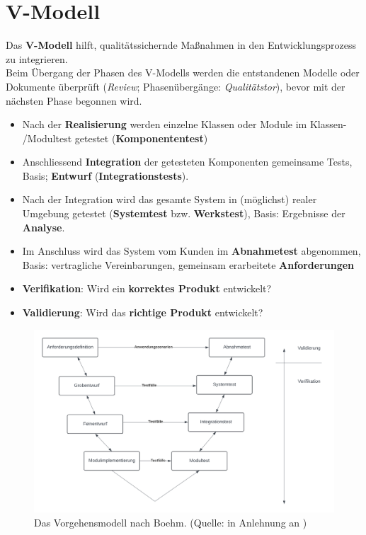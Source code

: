 \section{V-Modell}

\begin{tcolorbox}[title=V-Modell]
    Das \textbf{V-Modell} hilft, qualitätssichernde Maßnahmen in den Entwicklungsprozess zu integrieren.\\
    Beim Übergang der Phasen des V-Modells werden die entstandenen Modelle oder Dokumente überprüft (\textit{Review}; Phasenübergänge: \textit{Qualitätstor}), bevor mit der nächsten Phase begonnen wird.

    \begin{itemize}
        \item Nach der \textbf{Realisierung} werden einzelne Klassen oder Module im Klassen- /Modultest getestet (\textbf{Komponententest})
        \item Anschliessend \textbf{Integration} der getesteten Komponenten gemeinsame Tests, Basis; \textbf{Entwurf} (\textbf{Integrationstests}).
        \item Nach der Integration wird das gesamte System in (möglichst) realer Umgebung getestet (\textbf{Systemtest} bzw. \textbf{Werkstest}), Basis: Ergebnisse der \textbf{Analyse}.
        \item Im Anschluss wird das System  vom Kunden im \textbf{Abnahmetest} abgenommen, Basis: vertragliche Vereinbarungen, gemeinsam erarbeitete \textbf{Anforderungen}
    \end{itemize}

    \begin{itemize}
        \item \textbf{Verifikation}: Wird ein \textbf{korrektes Produkt} entwickelt?
        \item \textbf{Validierung}: Wird das \textbf{richtige Produkt} entwickelt?
    \end{itemize}


\end{tcolorbox}

\begin{figure}
    \centering
    \includegraphics[scale=0.3]{chapters/Glossar/img/vmodell}
    \caption{Das Vorgehensmodell nach Boehm. (Quelle: in Anlehnung an \cite[554, Abb. 20.11-2]{Bal08})}
    \label{fig:v-modell-cc}
\end{figure}
